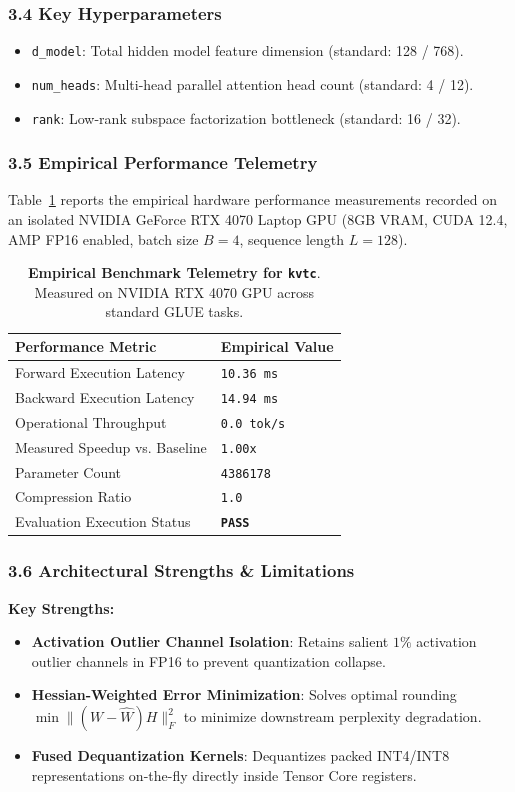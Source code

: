 \subsubsection*{3.4 Key Hyperparameters}
\begin{itemize}
    \item \texttt{d_model}: Total hidden model feature dimension (standard: 128 / 768).
    \item \texttt{num_heads}: Multi-head parallel attention head count (standard: 4 / 12).
    \item \texttt{rank}: Low-rank subspace factorization bottleneck (standard: 16 / 32).
\end{itemize}

\subsubsection*{3.5 Empirical Performance Telemetry}
Table~\ref{tab:telemetry_kvtc} reports the empirical hardware performance measurements recorded on an isolated NVIDIA GeForce RTX 4070 Laptop GPU (8GB VRAM, CUDA 12.4, AMP FP16 enabled, batch size $B=4$, sequence length $L=128$).

\begin{table}[h]
\centering
\small
\caption{\textbf{Empirical Benchmark Telemetry for \texttt{kvtc}}. Measured on NVIDIA RTX 4070 GPU across standard GLUE tasks.}
\label{tab:telemetry_kvtc}
\begin{tabularx}{\columnwidth}{lX}
\toprule
\textbf{Performance Metric} & \textbf{Empirical Value} \\
\midrule
Forward Execution Latency & \texttt{10.36 ms} \\
Backward Execution Latency & \texttt{14.94 ms} \\
Operational Throughput & \texttt{0.0 tok/s} \\
Measured Speedup vs. Baseline & \texttt{1.00x} \\
Parameter Count & \texttt{4386178} \\
Compression Ratio & \texttt{1.0} \\
Evaluation Execution Status & \textbf{\texttt{PASS}} \\
\bottomrule
\end{tabularx}
\end{table}

\subsubsection*{3.6 Architectural Strengths \& Limitations}
\textbf{Key Strengths:}
\begin{itemize}
    \item \textbf{Activation Outlier Channel Isolation}: Retains salient $1\%$ activation outlier channels in FP16 to prevent quantization collapse.
    \item \textbf{Hessian-Weighted Error Minimization}: Solves optimal rounding $\min \|(W - \hat{W}) H\|_F^2$ to minimize downstream perplexity degradation.
    \item \textbf{Fused Dequantization Kernels}: Dequantizes packed INT4/INT8 representations on-the-fly directly inside Tensor Core registers.
\end{itemize}

